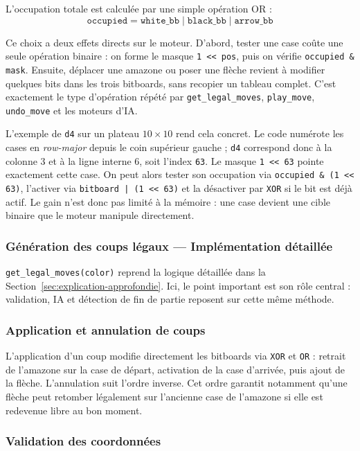 \documentclass[a4paper]{article}
\begin{document}
L'occupation totale est calculée par une simple opération OR :
\[
\texttt{occupied} = \texttt{white\_bb} \mid \texttt{black\_bb} \mid \texttt{arrow\_bb}
\]

Ce choix a deux effets directs sur le moteur. D'abord, tester une case coûte une seule opération binaire : on forme le masque \texttt{1 << pos}, puis on vérifie \texttt{occupied \& mask}. Ensuite, déplacer une amazone ou poser une flèche revient à modifier quelques bits dans les trois bitboards, sans recopier un tableau complet. C'est exactement le type d'opération répété par \texttt{get\_legal\_moves}, \texttt{play\_move}, \texttt{undo\_move} et les moteurs d'IA.

L'exemple de \texttt{d4} sur un plateau $10 \times 10$ rend cela concret. Le code numérote les cases en \textit{row-major} depuis le coin supérieur gauche ; \texttt{d4} correspond donc à la colonne 3 et à la ligne interne 6, soit l'index \texttt{63}. Le masque \texttt{1 << 63} pointe exactement cette case. On peut alors tester son occupation via \texttt{occupied \& (1 << 63)}, l'activer via \texttt{bitboard | (1 << 63)} et la désactiver par \texttt{XOR} si le bit est déjà actif. Le gain n'est donc pas limité à la mémoire : une case devient une cible binaire que le moteur manipule directement.

\subsubsection{Génération des coups légaux --- Implémentation détaillée}

\texttt{get\_legal\_moves(color)} reprend la logique détaillée dans la Section~\ref{sec:explication-approfondie}. Ici, le point important est son rôle central : validation, IA et détection de fin de partie reposent sur cette même méthode.

\subsubsection{Application et annulation de coups}

L'application d'un coup modifie directement les bitboards via \texttt{XOR} et \texttt{OR} : retrait de l'amazone sur la case de départ, activation de la case d'arrivée, puis ajout de la flèche. L'annulation suit l'ordre inverse. Cet ordre garantit notamment qu'une flèche peut retomber légalement sur l'ancienne case de l'amazone si elle est redevenue libre au bon moment.

\subsubsection{Validation des coordonnées}
\end{document}
